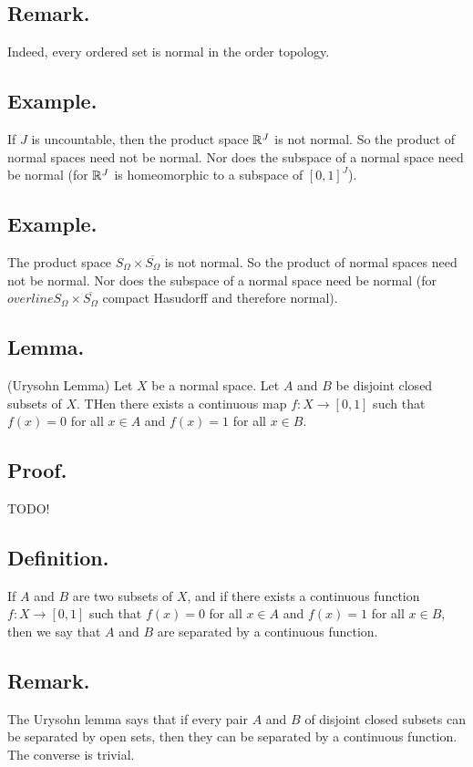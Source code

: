 \documentclass[titlepage]{article}
\begin{document}
\subsection{Remark.} Indeed, every ordered set is normal in the order topology.

\subsection{Example.} If $J$ is uncountable, then the product space $\mathbb{R}^{J}$ is not normal. So the product of normal spaces need not be normal. Nor does the subspace of a normal space need be normal (for $\mathbb{R}^{J}$ is homeomorphic to a subspace of $[0, 1]^{J}$).

\subsection{Example.} The product space $S_{\Omega} \times \overline{S_{\Omega}}$ is not normal. So the product of normal spaces need not be normal. Nor does the subspace of a normal space need be normal (for $overline{S_{\Omega}} \times \overline{S_{\Omega}}$ compact Hasudorff and therefore normal).

\subsection{Lemma.} (Urysohn Lemma) Let $X$ be a normal space. Let $A$ and $B$ be disjoint closed subsets of $X$. THen there exists a continuous map $f: X \to [0, 1]$ such that $f(x) = 0$ for all $x \in A$ and $f(x) = 1$ for all $x \in B$.

\subsection{Proof.} TODO!

\subsection{Definition.} If $A$ and $B$ are two subsets of $X$, and if there exists a continuous function $f: X \to [0, 1]$ such that $f(x) = 0$ for all $x \in A$ and $f(x) = 1$ for all $x \in B$, then we say that $A$ and $B$ are separated by a continuous function.

\subsection{Remark.} The Urysohn lemma says that if every pair $A$ and $B$ of disjoint closed subsets can be separated by open sets, then they can be separated by a continuous function. The converse is trivial.
\end{document}
